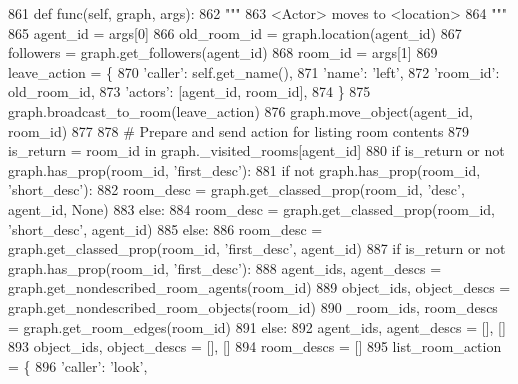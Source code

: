 \begin{DoxyCode}
861     \textcolor{keyword}{def }func(self, graph, args):
862         \textcolor{stringliteral}{"""}
863 \textcolor{stringliteral}{        <Actor> moves to <location>}
864 \textcolor{stringliteral}{        """}
865         agent\_id = args[0]
866         old\_room\_id = graph.location(agent\_id)
867         followers = graph.get\_followers(agent\_id)
868         room\_id = args[1]
869         leave\_action = \{
870             \textcolor{stringliteral}{'caller'}: self.get\_name(),
871             \textcolor{stringliteral}{'name'}: \textcolor{stringliteral}{'left'},
872             \textcolor{stringliteral}{'room\_id'}: old\_room\_id,
873             \textcolor{stringliteral}{'actors'}: [agent\_id, room\_id],
874         \}
875         graph.broadcast\_to\_room(leave\_action)
876         graph.move\_object(agent\_id, room\_id)
877 
878         \textcolor{comment}{# Prepare and send action for listing room contents}
879         is\_return = room\_id \textcolor{keywordflow}{in} graph.\_visited\_rooms[agent\_id]
880         \textcolor{keywordflow}{if} is\_return \textcolor{keywordflow}{or} \textcolor{keywordflow}{not} graph.has\_prop(room\_id, \textcolor{stringliteral}{'first\_desc'}):
881             \textcolor{keywordflow}{if} \textcolor{keywordflow}{not} graph.has\_prop(room\_id, \textcolor{stringliteral}{'short\_desc'}):
882                 room\_desc = graph.get\_classed\_prop(room\_id, \textcolor{stringliteral}{'desc'}, agent\_id, \textcolor{keywordtype}{None})
883             \textcolor{keywordflow}{else}:
884                 room\_desc = graph.get\_classed\_prop(room\_id, \textcolor{stringliteral}{'short\_desc'}, agent\_id)
885         \textcolor{keywordflow}{else}:
886             room\_desc = graph.get\_classed\_prop(room\_id, \textcolor{stringliteral}{'first\_desc'}, agent\_id)
887         \textcolor{keywordflow}{if} is\_return \textcolor{keywordflow}{or} \textcolor{keywordflow}{not} graph.has\_prop(room\_id, \textcolor{stringliteral}{'first\_desc'}):
888             agent\_ids, agent\_descs = graph.get\_nondescribed\_room\_agents(room\_id)
889             object\_ids, object\_descs = graph.get\_nondescribed\_room\_objects(room\_id)
890             \_room\_ids, room\_descs = graph.get\_room\_edges(room\_id)
891         \textcolor{keywordflow}{else}:
892             agent\_ids, agent\_descs = [], []
893             object\_ids, object\_descs = [], []
894             room\_descs = []
895         list\_room\_action = \{
896             \textcolor{stringliteral}{'caller'}: \textcolor{stringliteral}{'look'},

\end{DoxyCode}
